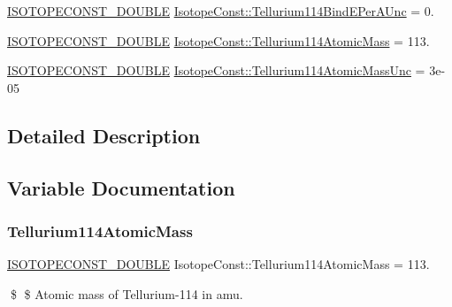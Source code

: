 \begin{DoxyCompactItemize}
\mbox{\hyperlink{group___isotope_const-_macros_ga8f45a7272ce02c0b4c65c44636ed719a}{I\+S\+O\+T\+O\+P\+E\+C\+O\+N\+S\+T\+\_\+\+D\+O\+U\+B\+LE}} \mbox{\hyperlink{group___isotope_const-_tellurium-_te114_gae8e8290fdd67ac446476345c5c36b31e}{Isotope\+Const\+::\+Tellurium114\+Bind\+E\+Per\+A\+Unc}} = 0.
\item 
\mbox{\hyperlink{group___isotope_const-_macros_ga8f45a7272ce02c0b4c65c44636ed719a}{I\+S\+O\+T\+O\+P\+E\+C\+O\+N\+S\+T\+\_\+\+D\+O\+U\+B\+LE}} \mbox{\hyperlink{group___isotope_const-_tellurium-_te114_ga5ba28517903d7d005ff0999a51a204eb}{Isotope\+Const\+::\+Tellurium114\+Atomic\+Mass}} = 113.
\item 
\mbox{\hyperlink{group___isotope_const-_macros_ga8f45a7272ce02c0b4c65c44636ed719a}{I\+S\+O\+T\+O\+P\+E\+C\+O\+N\+S\+T\+\_\+\+D\+O\+U\+B\+LE}} \mbox{\hyperlink{group___isotope_const-_tellurium-_te114_ga72665b552c573cddbc6c977cbcf16573}{Isotope\+Const\+::\+Tellurium114\+Atomic\+Mass\+Unc}} = 3e-\/05
\end{DoxyCompactItemize}


\subsection{Detailed Description}


\subsection{Variable Documentation}
\mbox{\label{group___isotope_const-_tellurium-_te114_ga5ba28517903d7d005ff0999a51a204eb}} 
\subsubsection{\texorpdfstring{Tellurium114\+Atomic\+Mass}{Tellurium114AtomicMass}}
{\footnotesize\ttfamily \mbox{\hyperlink{group___isotope_const-_macros_ga8f45a7272ce02c0b4c65c44636ed719a}{I\+S\+O\+T\+O\+P\+E\+C\+O\+N\+S\+T\+\_\+\+D\+O\+U\+B\+LE}} Isotope\+Const\+::\+Tellurium114\+Atomic\+Mass = 113.}

\$ \$ Atomic mass of Tellurium-\/114 in amu. \mbox{\label{group___isotope_const-_tellurium-_te114_ga72665b552c573cddbc6c977cbcf16573}} 
